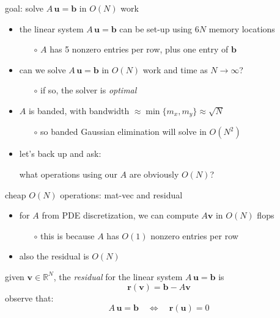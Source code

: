 \documentclass[10pt,
               svgnames,
               hyperref={colorlinks,citecolor=DeepPink4,linkcolor=FireBrick,urlcolor=Maroon},
               usepdftitle=false]{beamer}
\newcommand{\bb}{\mathbf{b}}
\newcommand{\br}{\mathbf{r}}
\newcommand{\bu}{\mathbf{u}}
\newcommand{\bv}{\mathbf{v}}
\newcommand{\RR}{\mathbb{R}}
\begin{document}
\begin{frame}{goal: solve $A\,\bu=\bb$ in $O(N)$ work}
\begin{itemize}
\item the linear system $A\,\bu=\bb$ can be set-up using  $6N$ memory locations
	\begin{itemize}
	\item[$\circ$] $A$ has 5 nonzero entries per row, plus one entry of $\bb$
	\end{itemize}
\item can we solve $A\,\bu=\bb$ in $O(N)$ work and time as $N\to\infty$?
	\begin{itemize}
	\item[$\circ$] if so, the solver is \emph{optimal}
	\end{itemize}

\bigskip
\item<2-> $A$ is banded, with bandwidth $\approx \min\{m_x,m_y\} \approx \sqrt{N}$
	\begin{itemize}
	\item[$\circ$] so banded Gaussian elimination will solve in $O(N^2)$
	\end{itemize}

\bigskip
\item<3> let's back up and ask:

\medskip
\qquad what operations using our $A$ are obviously $O(N)$?
\end{itemize}
\end{frame}


\begin{frame}{cheap $O(N)$ operations: mat-vec and residual}
\begin{itemize}
\item for $A$ from PDE discretization, we can compute $A\bv$ in $O(N)$ flops
	\begin{itemize}
	\item[$\circ$] this is because $A$ has $O(1)$ nonzero entries per row
	\end{itemize}
\item also the residual is $O(N)$
\end{itemize}

\bigskip
\begin{definition} given $\bv \in\RR^N$, the \emph{residual} for the linear system $A\,\bu=\bb$ is
	$$\br(\bv) = \bb - A\bv$$
observe that:
    $$A\,\bu = \bb \quad \iff \quad \br(\bu) = 0$$
\end{definition}
\end{frame}
\end{document}
